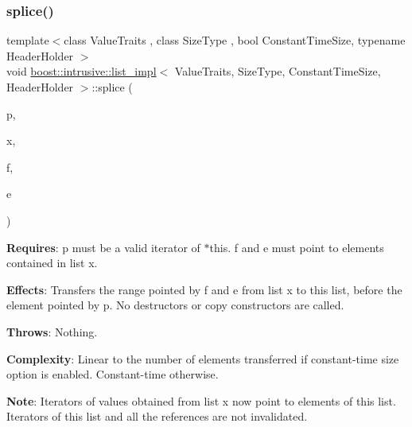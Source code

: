 \subsubsection{\texorpdfstring{splice()}{splice()}\hspace{0.1cm}{\footnotesize\ttfamily [3/4]}}
{\footnotesize\ttfamily template$<$class Value\+Traits , class Size\+Type , bool Constant\+Time\+Size, typename Header\+Holder $>$ \\
void \hyperlink{classboost_1_1intrusive_1_1list__impl}{boost\+::intrusive\+::list\+\_\+impl}$<$ Value\+Traits, Size\+Type, Constant\+Time\+Size, Header\+Holder $>$\+::splice (\begin{DoxyParamCaption}\item[{const\+\_\+iterator}]{p,  }\item[{\hyperlink{classboost_1_1intrusive_1_1list__impl}{list\+\_\+impl}$<$ Value\+Traits, Size\+Type, Constant\+Time\+Size, Header\+Holder $>$ \&}]{x,  }\item[{const\+\_\+iterator}]{f,  }\item[{const\+\_\+iterator}]{e }\end{DoxyParamCaption})\hspace{0.3cm}{\ttfamily [inline]}}

{\bfseries Requires}\+: p must be a valid iterator of $\ast$this. f and e must point to elements contained in list x.

{\bfseries Effects}\+: Transfers the range pointed by f and e from list x to this list, before the element pointed by p. No destructors or copy constructors are called.

{\bfseries Throws}\+: Nothing.

{\bfseries Complexity}\+: Linear to the number of elements transferred if constant-\/time size option is enabled. Constant-\/time otherwise.

{\bfseries Note}\+: Iterators of values obtained from list x now point to elements of this list. Iterators of this list and all the references are not invalidated. \mbox{\label{classboost_1_1intrusive_1_1list__impl_a561eb714c3b33ed907e4a0aaed234592}} 
